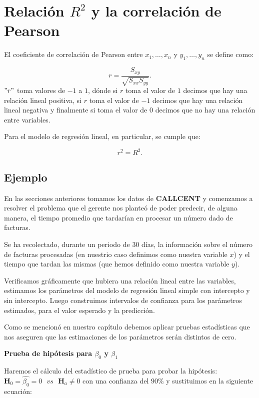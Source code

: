 \documentclass[
  a4paper,
  oneside,
  openany]{book}
\begin{document}
\hypertarget{relaciuxf3n-r2-y-la-correlaciuxf3n-de-pearson}{%
\section{\texorpdfstring{Relación \(R^2\) y la correlación de Pearson}{Relación R\^{}2 y la correlación de Pearson}}\label{relaciuxf3n-r2-y-la-correlaciuxf3n-de-pearson}}

El coeficiente de correlación de Pearson entre \(x_{1},\ldots, x_{n}\) y \(y_{1},\ldots, y_{n}\) se define como:

\[r=\frac{S_{xy}}{\sqrt{S_{xx}S_{yy}}}.\]
\("r"\) toma valores de \(-1\) a \(1\), dónde si \(r\) toma el valor de \(1\) decimos que hay una relación lineal positiva, si \(r\) toma el valor de \(-1\) decimos que hay una relación lineal negativa y finalmente si toma el valor de \(0\) decimos que no hay una relación entre variables.

Para el modelo de regresión lineal, en particular, se cumple que:

\[r^2=R^2.\]

\hypertarget{ejemplo-17}{%
\subsection{Ejemplo}\label{ejemplo-17}}

En las secciones anteriores tomamos los datos de \textbf{CALLCENT} y comenzamos a resolver el problema que el gerente nos planteó de poder
predecir, de alguna manera, el tiempo promedio que tardarían en procesar un número dado de facturas.

Se ha recolectado, durante un periodo de 30 días, la información sobre el número de facturas procesadas (en nuestrio caso definimos como nuestra variable \(x\)) y el tiempo que tardan las mismas (que hemos definido como nuestra variable \(y\)).

Verificamos gráficamente que hubiera una relación lineal entre las variables, estimamos los parámetros del modelo de regresión lineal simple con intercepto y sin intercepto. Luego construimos intervalos de confianza para los parámetros estimados, para el valor esperado y la predicción.

Como se mencionó en nuestro capítulo debemos aplicar pruebas estadísticas que nos aseguren que las estimaciones de los parámetros serán distintos de cero.

\textbf{Prueba de hipótesis para \(\beta_{0}\) y \(\beta_{1}\)}

Haremos el cálculo del estadístico de prueba para probar la hipótesis: \(\textbf{H}_0=\hat{\beta_{0}}=0 \ \ \ vs \ \ \ \textbf{H}_a \neq 0\) con una confianza del \(90\%\) y sustituimos en la siguiente ecuación:
\end{document}
